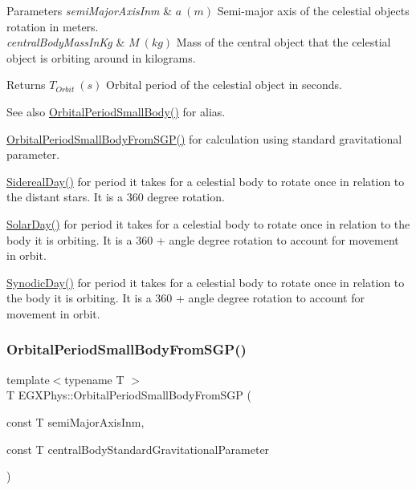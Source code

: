 \begin{DoxyParams}{Parameters}
{\em semi\+Major\+Axis\+Inm} & $ a\ (m)$ Semi-\/major axis of the celestial object\textquotesingle{}s rotation in meters. \\
\hline
{\em central\+Body\+Mass\+In\+Kg} & $ M\ (kg)$ Mass of the central object that the celestial object is orbiting around in kilograms. \\
\hline
\end{DoxyParams}
\begin{DoxyReturn}{Returns}
$ T_{Orbit}\ (s)$ Orbital period of the celestial object in seconds. 
\end{DoxyReturn}
\begin{DoxySeeAlso}{See also}
\mbox{\hyperlink{group___e_g_x_phys-_astrophysic-_orbital_period_ga5d4cc706d875fd82a83e566ade16546d}{Orbital\+Period\+Small\+Body()}} for alias. 

\mbox{\hyperlink{group___e_g_x_phys-_astrophysic-_orbital_period_gab3773d2109aef45ef4649b56e36d13f3}{Orbital\+Period\+Small\+Body\+From\+S\+G\+P()}} for calculation using standard gravitational parameter. 

\mbox{\hyperlink{group___e_g_x_phys-_astrophysic-_sidereal_day_ga587900d5fc755228c1bb5121cd7965c6}{Sidereal\+Day()}} for period it takes for a celestial body to rotate once in relation to the distant stars. It is a 360 degree rotation. 

\mbox{\hyperlink{group___e_g_x_phys-_astrophysic-_solar_day_gae321e0dd0c031a57c45b15dc819635e0}{Solar\+Day()}} for period it takes for a celestial body to rotate once in relation to the body it is orbiting. It is a 360 + angle degree rotation to account for movement in orbit. 

\mbox{\hyperlink{group___e_g_x_phys-_astrophysic-_synodic_day_ga637140842bc008c87d90e65b551cbac7}{Synodic\+Day()}} for period it takes for a celestial body to rotate once in relation to the body it is orbiting. It is a 360 + angle degree rotation to account for movement in orbit. 
\end{DoxySeeAlso}
\mbox{\label{group___e_g_x_phys-_astrophysic-_orbital_period_gab3773d2109aef45ef4649b56e36d13f3}} 
\subsubsection{\texorpdfstring{Orbital\+Period\+Small\+Body\+From\+S\+G\+P()}{OrbitalPeriodSmallBodyFromSGP()}}
{\footnotesize\ttfamily template$<$typename T $>$ \\
T E\+G\+X\+Phys\+::\+Orbital\+Period\+Small\+Body\+From\+S\+GP (\begin{DoxyParamCaption}\item[{const T}]{semi\+Major\+Axis\+Inm,  }\item[{const T}]{central\+Body\+Standard\+Gravitational\+Parameter }\end{DoxyParamCaption})}



